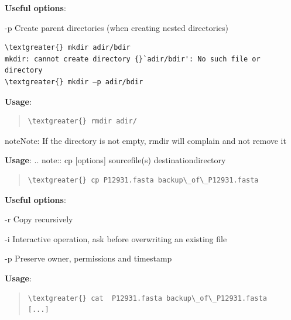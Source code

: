 \documentclass[letterpaper,10pt,english]{sphinxmanual}
\begin{document}
\textbf{Useful options}:
\begin{optionlist}{3cm}
\item [-p]  
Create parent directories (when creating nested directories)

\begin{Verbatim}[commandchars=\\\{\}]
\textgreater{} mkdir adir/bdir
mkdir: cannot create directory {}`adir/bdir': No such file or directory
\textgreater{} mkdir –p adir/bdir
\end{Verbatim}
\end{optionlist}

\textbf{Usage}:  
\begin{quote}

\begin{Verbatim}[commandchars=\\\{\}]
\textgreater{} rmdir adir/
\end{Verbatim}
\end{quote}

\begin{notice}{note}{Note:}
If the directory is not empty, rmdir will complain and not remove it
\end{notice}

\textbf{Usage}:  
.. note:: cp {[}options{]} sourcefile(s) destinationdirectory
\begin{quote}

\begin{Verbatim}[commandchars=\\\{\}]
\textgreater{} cp P12931.fasta backup\_of\_P12931.fasta
\end{Verbatim}
\end{quote}

\textbf{Useful options}:
\begin{optionlist}{3cm}
\item [-r]  
Copy recursively
\item [-i]  
Interactive operation, ask before overwriting an existing file
\item [-p]  
Preserve owner, permissions and timestamp
\end{optionlist}

\textbf{Usage}:  
\begin{quote}

\begin{Verbatim}[commandchars=\\\{\}]
\textgreater{} cat  P12931.fasta backup\_of\_P12931.fasta
[...]
\end{Verbatim}
\end{quote}
\end{document}
